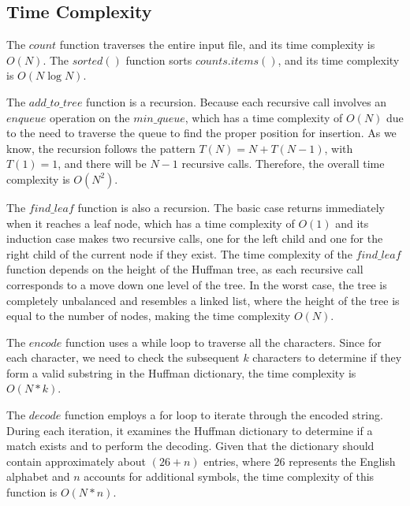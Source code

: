 \documentclass[12pt]{article}
\begin{document}
\subsection{Time Complexity}
The $count$ function traverses the entire input file, and its time complexity is \( O(N) \). The $sorted()$ function sorts $counts.items()$, and its time complexity is \( O(N \log N) \).
\par The $add\_to\_tree$ function is a recursion. Because each recursive call involves an $enqueue$ operation on the $min\_queue$, which has a time complexity of $O(N)$ due to the need to traverse the queue to find the proper position for insertion. As we know, the recursion follows the pattern $T(N) = N + T(N-1)$, with $T(1) = 1$, and there will be $N-1$ recursive calls. Therefore, the overall time complexity is $O(N^2)$.
\par The $find\_leaf$ function is also a recursion. The basic case returns immediately when it reaches a leaf node, which has a time complexity of $O(1)$ and its induction case makes two recursive calls, one for the left child and one for the right child of the current node if they exist.
The time complexity of the $find\_leaf$ function depends on the height of the Huffman tree, as each recursive call corresponds to a move down one level of the tree. In the worst case, the tree is completely unbalanced and resembles a linked list, where the height of the tree is equal to the number of nodes, making the time complexity $O(N)$.
\par The $encode$ function uses a while loop to traverse all the characters. Since for each character, we need to check the subsequent $k$ characters to determine if they form a valid substring in the Huffman dictionary, the time complexity is $O(N*k)$.
\par The $decode$ function employs a for loop to iterate through the encoded string. During each iteration, it examines the Huffman dictionary to determine if a match exists and to perform the decoding. Given that the dictionary should contain approximately about $(26 + n)$ entries, where 26 represents the English alphabet and $n$ accounts for additional symbols, the time complexity of this function is $O(N*n)$. 
\end{document}
